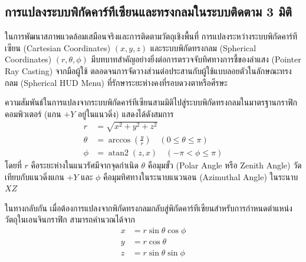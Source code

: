 \subsection{การแปลงระบบพิกัดคาร์ทีเซียนและทรงกลมในระบบติดตาม 3 มิติ}

ในการพัฒนาสภาพแวดล้อมเสมือนจริงและการติดตามวัตถุเชิงพื้นที่ การแปลงระหว่างระบบพิกัดคาร์ทีเซียน (Cartesian Coordinates) $(x, y, z)$ และระบบพิกัดทรงกลม (Spherical Coordinates) $(r, \theta, \phi)$ มีบทบาทสำคัญอย่างยิ่งต่อการตรวจจับทิศทางการชี้ของลำแสง (Pointer Ray Casting) จากมือผู้ใช้ ตลอดจนการจัดวางส่วนต่อประสานกับผู้ใช้แบบลอยตัวในลักษณะทรงกลม (Spherical HUD Menu) ที่รักษาระยะห่างคงที่รอบดวงตาหรือศีรษะ

ความสัมพันธ์ในการแปลงจากระบบพิกัดคาร์ทีเซียนสามมิติไปสู่ระบบพิกัดทรงกลมในมาตรฐานกราฟิกคอมพิวเตอร์ (แกน $+Y$ อยู่ในแนวดิ่ง) แสดงได้ดังสมการ
\begin{align}
r &= \sqrt{x^2 + y^2 + z^2} \label{eq:spherical_r} \\
\theta &= \arccos\left(\frac{y}{r}\right) \quad (0 \le \theta \le \pi) \label{eq:spherical_theta} \\
\phi &= \operatorname{atan2}(z, x) \quad (-\pi < \phi \le \pi) \label{eq:spherical_phi}
\end{align}
โดยที่ $r$ คือระยะห่างในแนวรัศมีจากจุดกำเนิด $\theta$ คือมุมขั้ว (Polar Angle หรือ Zenith Angle) วัดเทียบกับแนวดิ่งแกน $+Y$ และ $\phi$ คือมุมทิศทางในระนาบแนวนอน (Azimuthal Angle) ในระนาบ $XZ$

ในทางกลับกัน เมื่อต้องการแปลงจากพิกัดทรงกลมกลับสู่พิกัดคาร์ทีเซียนสำหรับการกำหนดตำแหน่งวัตถุในเอนจินกราฟิก สามารถคำนวณได้จาก
\begin{align}
x &= r \sin\theta \cos\phi \label{eq:cartesian_x} \\
y &= r \cos\theta \label{eq:cartesian_y} \\
z &= r \sin\theta \sin\phi \label{eq:cartesian_z}
\end{align}

